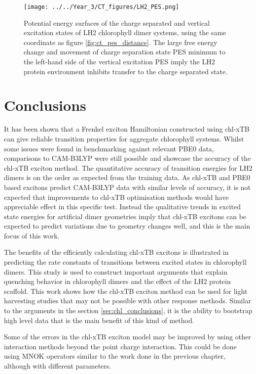 \begin{figure}
    \centering
    \texttt{[image: ../../Year\_3/CT\_figures/LH2\_PES.png]}
    \label{fig:ct_pes_lh2}
    \caption{Potential energy surfaces of the charge separated and vertical excitation
    states of LH2 chlorophyll dimer systems, using the same coordinate as figure
    \ref{fig:ct_pes_distance}. The large free energy change and movement of charge
    separation state PES minimum to the left-hand side of the vertical excitation 
    PES imply the LH2 protein environment inhibits transfer to the charge separated
    state.}
\end{figure}

\section{Conclusions}
\label{sec:exciton_concs}

It has been shown that a Frenkel exciton Hamiltonian constructed using chl-xTB can
give reliable transition properties for aggregate chlorophyll systems. Whilst some
issues were found in benchmarking against relevant PBE0 data, comparisons to CAM-B3LYP 
were still possible and showcase the accuracy of the chl-xTB exciton method. The
quantitative accuracy of transition energies for LH2 dimers is on the order as expected
from the training data. As chl-xTB and PBE0 based excitons predict CAM-B3LYP data
with similar levels of accuracy, it is not expected that improvements to chl-xTB
optimisation methods would have appreciable effect in this specific test. Instead
the qualitative trends in excited state energies for artificial dimer geometries
imply that chl-xTB excitons can be expected to predict variations due to geometry 
changes well, and this is the main focus of this work.

The benefits of the efficiently calculating chl-xTB excitons is illustrated in 
predicting the rate constants of transitions between excited states in chlorophyll
dimers. This study is used to construct important arguments that explain quenching
behavior in chlorophyll dimers and the effect of the LH2 protein scaffold. This work
shows how the chl-xTB exciton method can be used for light harvesting studies that 
may not be possible with other response methods. Similar to the arguments in the 
section \ref{sec:chl_conclusions}, it is the ability to bootstrap high level data 
that is the main benefit of this kind of method.

Some of the errors in the chl-xTB exciton model may be improved by using other interaction
methods beyond the point charge interaction. This could be done using MNOK operators
similar to the work done in the previous chapter, although with different parameters.

